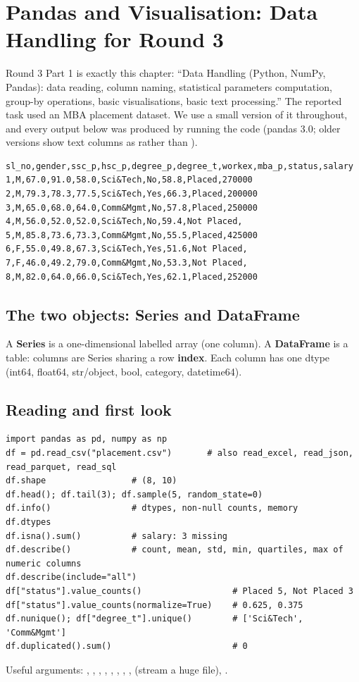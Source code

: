 \chapter{Pandas and Visualisation: Data Handling for Round 3}

Round 3 Part 1 is exactly this chapter: ``Data Handling (Python, NumPy, Pandas): data reading, column naming, statistical parameters computation,
group-by operations, basic visualisations, basic text processing.'' The reported task used an MBA placement dataset. We use a small version of it
throughout, and every output below was produced by running the code (pandas 3.0; older versions show text columns as  rather than
).

\begin{lstlisting}
sl_no,gender,ssc_p,hsc_p,degree_p,degree_t,workex,mba_p,status,salary
1,M,67.0,91.0,58.0,Sci&Tech,No,58.8,Placed,270000
2,M,79.3,78.3,77.5,Sci&Tech,Yes,66.3,Placed,200000
3,M,65.0,68.0,64.0,Comm&Mgmt,No,57.8,Placed,250000
4,M,56.0,52.0,52.0,Sci&Tech,No,59.4,Not Placed,
5,M,85.8,73.6,73.3,Comm&Mgmt,No,55.5,Placed,425000
6,F,55.0,49.8,67.3,Sci&Tech,Yes,51.6,Not Placed,
7,F,46.0,49.2,79.0,Comm&Mgmt,No,53.3,Not Placed,
8,M,82.0,64.0,66.0,Sci&Tech,Yes,62.1,Placed,252000
\end{lstlisting}

\section{The two objects: Series and DataFrame}
A \textbf{Series} is a one-dimensional labelled array (one column). A \textbf{DataFrame} is a table: columns are Series sharing a row \textbf{index}. Each column has
one dtype (int64, float64, str/object, bool, category, datetime64).

\section{Reading and first look}
\begin{lstlisting}
import pandas as pd, numpy as np
df = pd.read_csv("placement.csv")       # also read_excel, read_json, read_parquet, read_sql
df.shape                 # (8, 10)
df.head(); df.tail(3); df.sample(5, random_state=0)
df.info()                # dtypes, non-null counts, memory
df.dtypes
df.isna().sum()          # salary: 3 missing
df.describe()            # count, mean, std, min, quartiles, max of numeric columns
df.describe(include="all")
df["status"].value_counts()                  # Placed 5, Not Placed 3
df["status"].value_counts(normalize=True)    # 0.625, 0.375
df.nunique(); df["degree_t"].unique()        # ['Sci&Tech', 'Comm&Mgmt']
df.duplicated().sum()                        # 0
\end{lstlisting}
Useful  arguments: , , , , , , ,
,  (stream a huge file), .


